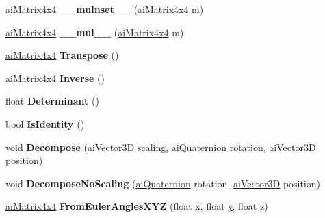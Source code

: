 \begin{DoxyCompactItemize}
\item 
\hypertarget{structai_matrix4x4_ae5dc5482c89d523226033ed154ae3e13}{\hyperlink{structai_matrix4x4}{ai\+Matrix4x4} {\bfseries \+\_\+\+\_\+mulnset\+\_\+\+\_\+} (\hyperlink{structai_matrix4x4}{ai\+Matrix4x4} m)}\label{structai_matrix4x4_ae5dc5482c89d523226033ed154ae3e13}

\item 
\hypertarget{structai_matrix4x4_a6699e6d5760e4ce4593bdf57bc79e8c7}{\hyperlink{structai_matrix4x4}{ai\+Matrix4x4} {\bfseries \+\_\+\+\_\+mul\+\_\+\+\_\+} (\hyperlink{structai_matrix4x4}{ai\+Matrix4x4} m)}\label{structai_matrix4x4_a6699e6d5760e4ce4593bdf57bc79e8c7}

\item 
\hypertarget{structai_matrix4x4_aa09088be2f035afb401b978570a5125c}{\hyperlink{structai_matrix4x4}{ai\+Matrix4x4} {\bfseries Transpose} ()}\label{structai_matrix4x4_aa09088be2f035afb401b978570a5125c}

\item 
\hypertarget{structai_matrix4x4_a75e816fd2f58f51f0e3248a6770ec5e1}{\hyperlink{structai_matrix4x4}{ai\+Matrix4x4} {\bfseries Inverse} ()}\label{structai_matrix4x4_a75e816fd2f58f51f0e3248a6770ec5e1}

\item 
\hypertarget{structai_matrix4x4_a63d6a7851f827ac1455161f307976496}{float {\bfseries Determinant} ()}\label{structai_matrix4x4_a63d6a7851f827ac1455161f307976496}

\item 
\hypertarget{structai_matrix4x4_a45c0b6c2344bea0e894cc4675da4cf39}{bool {\bfseries Is\+Identity} ()}\label{structai_matrix4x4_a45c0b6c2344bea0e894cc4675da4cf39}

\item 
\hypertarget{structai_matrix4x4_aeda4a2e44f5e7c09fae0dc71c7a311cd}{void {\bfseries Decompose} (\hyperlink{structai_vector3_d}{ai\+Vector3\+D} scaling, \hyperlink{structai_quaternion}{ai\+Quaternion} rotation, \hyperlink{structai_vector3_d}{ai\+Vector3\+D} position)}\label{structai_matrix4x4_aeda4a2e44f5e7c09fae0dc71c7a311cd}

\item 
\hypertarget{structai_matrix4x4_afeccb4be71144fad69e140cc2c0a97f3}{void {\bfseries Decompose\+No\+Scaling} (\hyperlink{structai_quaternion}{ai\+Quaternion} rotation, \hyperlink{structai_vector3_d}{ai\+Vector3\+D} position)}\label{structai_matrix4x4_afeccb4be71144fad69e140cc2c0a97f3}

\item 
\hypertarget{structai_matrix4x4_a3809aae2663ebdb4b07046ae102f08bf}{\hyperlink{structai_matrix4x4}{ai\+Matrix4x4} {\bfseries From\+Euler\+Angles\+X\+Y\+Z} (float x, float \hyperlink{_ice_utils_8h_aa7ffaed69623192258fb8679569ff9ba}{y}, float z)}\label{structai_matrix4x4_a3809aae2663ebdb4b07046ae102f08bf}


\end{DoxyCompactItemize}
